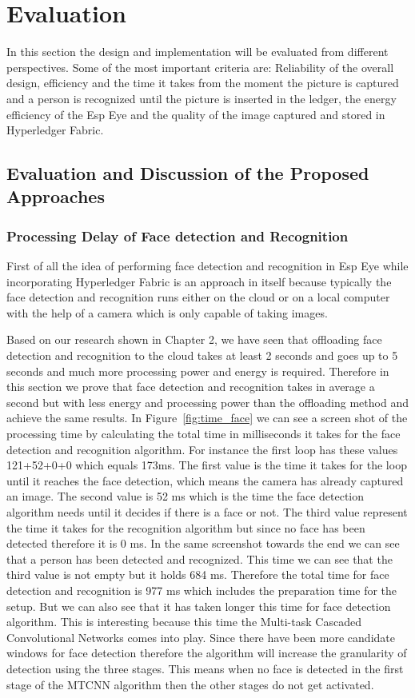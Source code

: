 \chapter{Evaluation}

In this section the design and implementation will be evaluated from different perspectives. Some of the most important criteria are: Reliability of the overall design, efficiency and the time it takes from the moment the picture is captured and a person is recognized until the picture is inserted in the ledger, the energy efficiency of the Esp Eye and the quality of the image captured and stored in Hyperledger Fabric.
\section{Evaluation and Discussion of the Proposed Approaches}

\subsection{Processing Delay of Face detection and Recognition}
First of all the idea of performing face detection and recognition in Esp Eye while incorporating Hyperledger Fabric is an approach in itself because typically the face detection and recognition runs either on the cloud or on a local computer with the help of a camera which is only capable of taking images. 

Based on our research shown in Chapter 2, we have seen that offloading face detection and recognition to the cloud takes at least 2 seconds and goes up to 5 seconds and much more processing power and energy is required. Therefore in this section we prove that face detection and recognition takes in average a second but with less energy and processing power than the offloading method and achieve the same results. In Figure~\ref{fig:time_face} we can see a screen shot of the processing time by calculating the total time in milliseconds it takes for the face detection and recognition algorithm. For instance the first loop has these values 121+52+0+0 which equals 173ms. The first value is the time it takes for the loop until it reaches the face detection, which means the camera has already captured an image. The second value is 52 ms which is the time the face detection algorithm needs until it decides if there is a face or not. The third value represent the time it takes for the recognition algorithm but since no face has been detected therefore it is 0 ms. In the same screenshot towards the end we can see that a person has been detected and recognized. This time we can see that the third value is not empty but it holds 684 ms. Therefore the total time for face detection and recognition is 977 ms which includes the preparation time for the setup. But we can also see that it has taken longer this time for face detection algorithm. This is interesting because this time the Multi-task Cascaded Convolutional Networks comes into play. Since there have been more candidate windows for face detection therefore the algorithm will increase the granularity of detection using the three stages. This means when no face is detected in the first stage of the MTCNN algorithm then the other stages do not get activated. 



